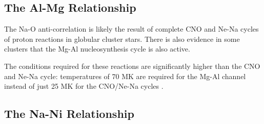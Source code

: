 \documentclass{emulateapj}
\begin{document}




\subsection{The Al-Mg Relationship}

The Na-O anti-correlation is likely the result of complete CNO and Ne-Na cycles of proton reactions in globular cluster stars. There is also evidence in some clusters that the Mg-Al nucleosynthesis cycle is also active. 

 The conditions required for these reactions are significantly higher than the CNO and Ne-Na cycle: temperatures of 70 MK are required for the Mg-Al channel instead of just 25 MK for the CNO/Ne-Na cycles \citet{Charbonnel_Prantzos_2006}. 


\subsection{The Na-Ni Relationship}








\end{document}
